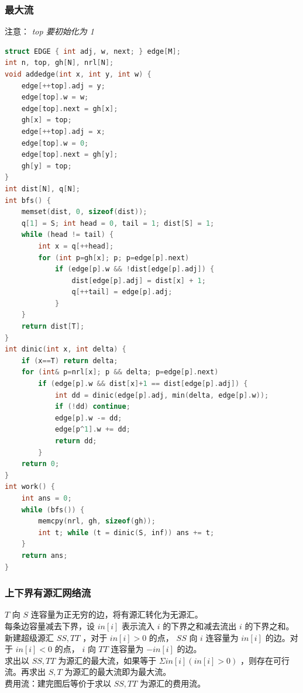 \documentclass{article}
\begin{document}
\subsubsection{最大流}
注意： \emph{top 要初始化为 1}
\begin{lstlisting}[language=C++]
struct EDGE { int adj, w, next; } edge[M];
int n, top, gh[N], nrl[N];
void addedge(int x, int y, int w) {
	edge[++top].adj = y;
	edge[top].w = w;
	edge[top].next = gh[x];
	gh[x] = top;
	edge[++top].adj = x;
	edge[top].w = 0;
	edge[top].next = gh[y];
	gh[y] = top;
}
int dist[N], q[N];
int bfs() {
	memset(dist, 0, sizeof(dist));
	q[1] = S; int head = 0, tail = 1; dist[S] = 1;
	while (head != tail) {
		int x = q[++head];
		for (int p=gh[x]; p; p=edge[p].next)
			if (edge[p].w && !dist[edge[p].adj]) {
				dist[edge[p].adj] = dist[x] + 1;
				q[++tail] = edge[p].adj;
			}
	}
	return dist[T];
}
int dinic(int x, int delta) {
	if (x==T) return delta;
	for (int& p=nrl[x]; p && delta; p=edge[p].next)
		if (edge[p].w && dist[x]+1 == dist[edge[p].adj]) {
			int dd = dinic(edge[p].adj, min(delta, edge[p].w));
			if (!dd) continue;
			edge[p].w -= dd;
			edge[p^1].w += dd;
			return dd;
		}
	return 0;
}
int work() {
	int ans = 0;
	while (bfs()) {
		memcpy(nrl, gh, sizeof(gh));
		int t; while (t = dinic(S, inf)) ans += t;
	}
	return ans;
}
\end{lstlisting}
\subsubsection{上下界有源汇网络流}
$T$ 向 $S$ 连容量为正无穷的边，将有源汇转化为无源汇。 \\
每条边容量减去下界，设 $in[i]$ 表示流入 $i$ 的下界之和减去流出 $i$ 的下界之和。  \\
新建超级源汇 $SS, TT$ ，对于 $in[i] > 0$ 的点， $SS$ 向 $i$ 连容量为 $in[i]$ 的边。对于 $in[i] < 0$ 的点， $i$ 向 $TT$ 连容量为 $-in[i]$ 的边。 \\
求出以 $SS, TT$ 为源汇的最大流，如果等于 $\Sigma in[i] (in[i]>0)$ ，则存在可行流。再求出 $S, T$ 为源汇的最大流即为最大流。 \\
费用流：建完图后等价于求以 $SS, TT$ 为源汇的费用流。
\end{document}

